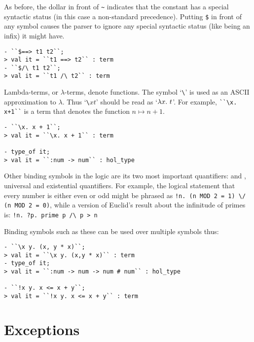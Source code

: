     As before, the dollar in front of {\small\verb|~|} indicates that
    the constant has a special syntactic status (in this case a
    non-standard precedence). Putting {\small\verb|$|} in front of any
    symbol causes the parser to ignore any special syntactic status
    (like being an infix) it might have.

\begin{session}\begin{verbatim}
- ``$==> t1 t2``;
> val it = ``t1 ==> t2`` : term
- ``$/\ t1 t2``;
> val it = ``t1 /\ t2`` : term
\end{verbatim}\end{session}

    Lambda-terms, or $\lambda$-terms, denote functions. The symbol
    `{\small\verb|\|}' is used as an {\small ASCII} approximation to
    $\lambda$.  Thus `{\small\verb|\|}$x$$t$' should be read as
    `$\lambda x.\ t$'. For example, {\small\verb|``\x. x+1``|} is a term
    that denotes the function $n\mapsto n{+}1$.

\begin{session}\begin{verbatim}
- ``\x. x + 1``;
> val it = ``\x. x + 1`` : term

- type_of it;
> val it = ``:num -> num`` : hol_type
\end{verbatim}\end{session}

    Other binding symbols in the logic are its two most important
    quantifiers: \ml{!} and , universal and existential
    quantifiers.  For example, the logical statement that every number
    is either even or odd might be phrased as
    {\small\verb|!n. (n MOD 2 = 1) \/ (n MOD 2 = 0)|}, while a version
    of Euclid's result about the infinitude of primes is:
    {\small\verb|!n. ?p. prime p /\ p > n|}

    Binding symbols such as these can be used over multiple symbols
    thus:

\begin{session}\begin{verbatim}
- ``\x y. (x, y * x)``;
> val it = ``\x y. (x,y * x)`` : term
- type_of it;
> val it = ``:num -> num -> num # num`` : hol_type

- ``!x y. x <= x + y``;
> val it = ``!x y. x <= x + y`` : term
\end{verbatim}\end{session}


\section{Exceptions}
\label{sec:exceptions}

